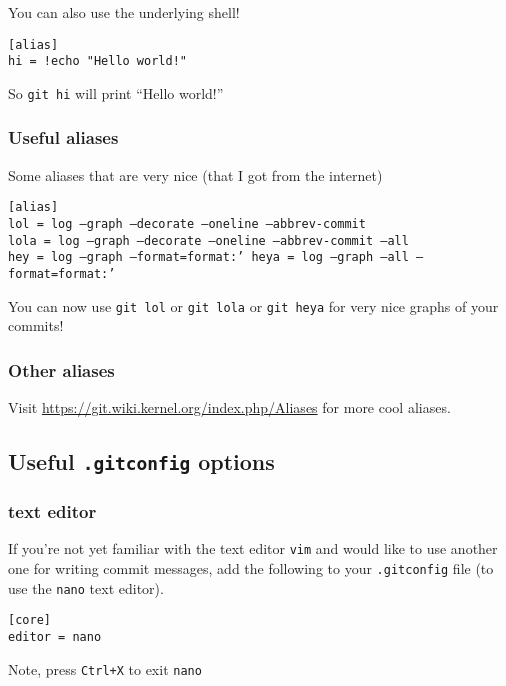 \documentclass[12pt]{article}
\begin{document}
You can also use the underlying shell!

\texttt{[alias]\\
hi = !echo "Hello world!"
}

So \texttt{git hi} will print ``Hello world!''


\subsubsection{Useful aliases}
Some aliases that are very nice (that I got from the internet)

\texttt{[alias]\\
lol = log --graph --decorate --oneline --abbrev-commit\\
lola = log --graph --decorate --oneline --abbrev-commit --all\\
hey = log --graph --format=format:'%
heya = log --graph --all --format=format:'%
}

You can now use \texttt{git lol} or \texttt{git lola} or \texttt{git heya} for very nice graphs of your commits!

\subsubsection{Other aliases}
Visit \url{https://git.wiki.kernel.org/index.php/Aliases} for more cool aliases.
\subsection{Useful \texttt{.gitconfig} options}

\subsubsection{text editor}
If you're not yet familiar with the text editor \texttt{vim} and would like to use another one for writing commit messages, add the following to your \texttt{.gitconfig} file (to use the \texttt{nano} text editor).

\texttt{[core]\\
editor = nano }

Note, press \texttt{Ctrl+X} to exit \texttt{nano}
\end{document}
